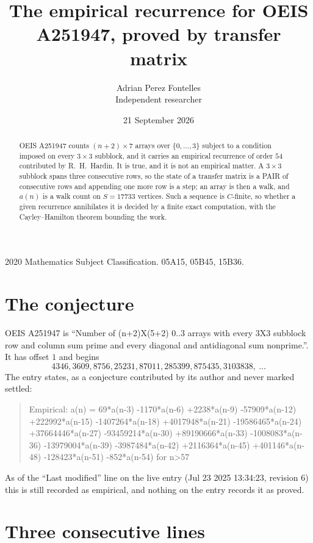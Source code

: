 \documentclass[11pt,a4paper]{article}
\title{The empirical recurrence for OEIS A251947, proved by transfer matrix}
\author{Adrian Perez Fontelles\\ \small Independent researcher}
\date{21 September 2026}
\theoremstyle{plain}
\theoremstyle{definition}
\begin{document}
\maketitle

\begin{abstract}
OEIS A251947 counts $(n+2)\times7$ arrays over $\{0,\dots,3\}$ subject to a condition imposed on
every $3\times3$ subblock, and it carries an empirical recurrence of order $54$
contributed by R.~H.~Hardin. It is true, and it is not an empirical matter. A $3\times3$
subblock spans three consecutive rows, so the state of a transfer matrix is a PAIR of
consecutive rows and appending one more row is a step; an array is then a walk, and
$a(n)$ is a walk count on $S=17733$ vertices. Such a sequence is $C$-finite, so whether a given
recurrence annihilates it is decided by a finite exact computation, with the Cayley--Hamilton
theorem bounding the work.
\end{abstract}

\noindent\small 2020 Mathematics Subject Classification. 05A15, 05B45, 15B36.\normalsize

\section{The conjecture}

OEIS A251947 is ``Number of (n+2)X(5+2) 0..3 arrays with every 3X3 subblock row and column sum prime and every diagonal and antidiagonal sum nonprime.''. It has offset $1$ and begins
\[
4346, 3609, 8756, 25231, 87011, 285399, 875435, 3103838,\ \dots
\]
The entry states, as a conjecture contributed by its author and never marked settled:
\begin{quote}
Empirical: a(n) = 69*a(n-3) -1170*a(n-6) +2238*a(n-9) -57909*a(n-12) +222992*a(n-15) -1407264*a(n-18) +4017948*a(n-21) -19586465*a(n-24) +37664446*a(n-27) -93459214*a(n-30) +89190666*a(n-33) -1008083*a(n-36) -13979004*a(n-39) -3987484*a(n-42) +2116364*a(n-45) +401146*a(n-48) -128423*a(n-51) -852*a(n-54) for n>57
\end{quote}
As of the ``Last modified'' line on the live entry (Jul 23 2025 13:34:23, revision 6) this is still
recorded as empirical, and nothing on the entry records it as proved.

\section{Three consecutive lines}
\end{document}
